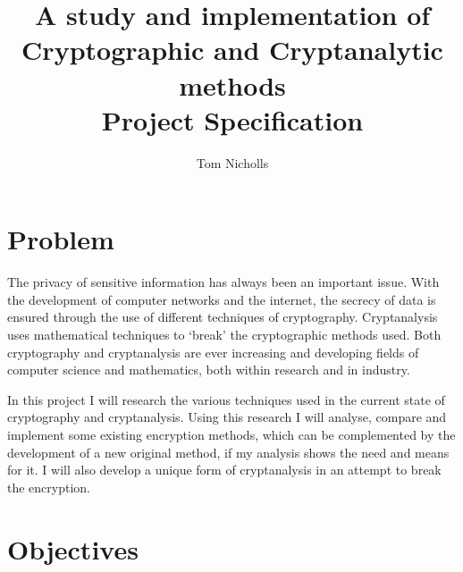 \documentclass[a4paper,11pt]{article}
\title{A study and implementation of Cryptographic and Cryptanalytic methods \\ Project Specification}
\author{Tom Nicholls}
\date{}
\begin{document}
\maketitle

\section{Problem}

The privacy of sensitive information has always been an important issue. With the development of computer networks and the internet, the secrecy of data is ensured through the use of different techniques of cryptography. Cryptanalysis uses mathematical techniques to ‘break’ the cryptographic methods used. Both cryptography and cryptanalysis are ever increasing and developing fields of computer science and mathematics, both within research and in industry. 

In this project I will research the various techniques used in the current state of cryptography and cryptanalysis. Using this research I will analyse, compare and implement some existing encryption methods, which can be complemented by the development of a new original method, if my analysis shows the need and means for it. I will also develop a unique form of cryptanalysis in an attempt to break the encryption.

\section{Objectives}
\end{document}
